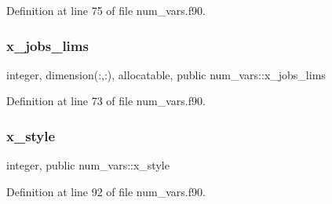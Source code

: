 Definition at line 75 of file num\+\_\+vars.\+f90.

\mbox{\label{namespacenum__vars_a476c029a4a53aa1f707d54d18d3c80a0}} 
\subsubsection{\texorpdfstring{x\+\_\+jobs\+\_\+lims}{x\_jobs\_lims}}
{\footnotesize\ttfamily integer, dimension(\+:,\+:), allocatable, public num\+\_\+vars\+::x\+\_\+jobs\+\_\+lims}



Definition at line 73 of file num\+\_\+vars.\+f90.

\mbox{\label{namespacenum__vars_ad847b8c0cbf1e841c788bd657b40af5f}} 
\subsubsection{\texorpdfstring{x\+\_\+style}{x\_style}}
{\footnotesize\ttfamily integer, public num\+\_\+vars\+::x\+\_\+style}



Definition at line 92 of file num\+\_\+vars.\+f90.

